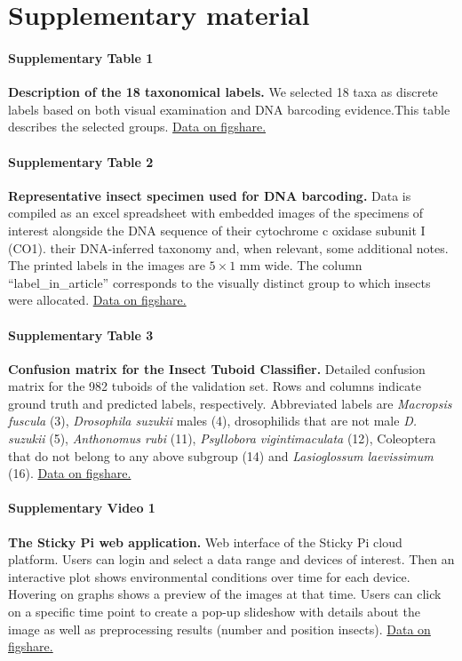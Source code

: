\documentclass[12pt]{article}
\begin{document}
	\clearpage
	\newpage
	\section*{Supplementary material}
	
	\paragraph*{Supplementary Table 1}
	\textbf{Description of the 18 taxonomical labels.} We selected 18 taxa as discrete labels based on both visual examination and DNA barcoding evidence.This table describes the selected groups.
	\href{https://figshare.com/s/999a3b7a3c23a050b106}{Data on figshare.}
	
	\paragraph*{Supplementary Table 2}
	\textbf{Representative insect specimen used for DNA barcoding.} 
	Data is compiled as an excel spreadsheet with embedded images of the specimens of interest alongside the DNA sequence of their cytochrome c oxidase subunit I (CO1). their DNA-inferred taxonomy and, when relevant, some additional notes. 
	The printed labels in the images are $5 \times{} 1$ mm wide. The column “label\_in\_article” corresponds to the visually distinct group to which insects were allocated.
	\href{https://figshare.com/s/bdb7bef8c26065e3dd17}{Data on figshare.}
	
	\paragraph*{Supplementary Table 3}
	\textbf{Confusion matrix for the Insect Tuboid Classifier.} 
	Detailed confusion matrix for the 982 tuboids of the validation set.
	Rows and columns indicate ground truth and predicted labels, respectively.
	Abbreviated labels are \emph{Macropsis fuscula} (3), \emph{Drosophila suzukii} males (4), drosophilids that are not male \emph{D. suzukii} (5), \emph{Anthonomus rubi} (11), \emph{Psyllobora vigintimaculata} (12), Coleoptera that do not belong to any above subgroup (14) and \emph{Lasioglossum laevissimum} (16).
    \href{https://figshare.com/s/7585a7cb174160a1c416}{Data on figshare.}
	
	
	
	\paragraph*{Supplementary Video 1}
	\textbf{The Sticky Pi web application.} Web interface of the Sticky Pi cloud platform. Users can login and select a data range and devices of interest. Then an interactive plot shows environmental conditions over time for each device. Hovering on graphs shows a preview of the images at that time. Users can click on a specific time point to create a pop-up slideshow with details about the image as well as preprocessing results (number and position insects).
	\href{https://figshare.com/s/e901a8943d4459cb8f08}{Data on figshare.}
	
\end{document}
